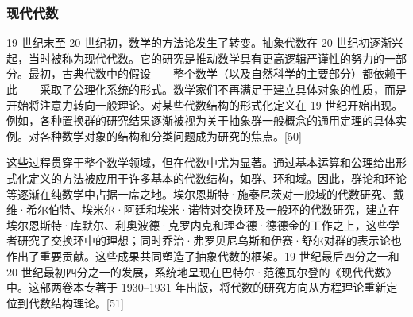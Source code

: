 \subsubsection{现代代数}
19 世纪末至 20 世纪初，数学的方法论发生了转变。抽象代数在 20 世纪初逐渐兴起，当时被称为现代代数。它的研究是推动数学具有更高逻辑严谨性的努力的一部分。最初，古典代数中的假设——整个数学（以及自然科学的主要部分）都依赖于此——采取了公理化系统的形式。数学家们不再满足于建立具体对象的性质，而是开始将注意力转向一般理论。对某些代数结构的形式化定义在 19 世纪开始出现。例如，各种置换群的研究结果逐渐被视为关于抽象群一般概念的通用定理的具体实例。对各种数学对象的结构和分类问题成为研究的焦点。[50]

这些过程贯穿于整个数学领域，但在代数中尤为显著。通过基本运算和公理给出形式化定义的方法被应用于许多基本的代数结构，如群、环和域。因此，群论和环论等逐渐在纯数学中占据一席之地。埃尔恩斯特·施泰尼茨对一般域的代数研究、戴维·希尔伯特、埃米尔·阿廷和埃米·诺特对交换环及一般环的代数研究，建立在埃尔恩斯特·库默尔、利奥波德·克罗内克和理查德·德德金的工作之上，这些学者研究了交换环中的理想；同时乔治·弗罗贝尼乌斯和伊赛·舒尔对群的表示论也作出了重要贡献。这些成果共同塑造了抽象代数的框架。19 世纪最后四分之一和 20 世纪最初四分之一的发展，系统地呈现在巴特尔·范德瓦尔登的《现代代数》中。这部两卷本专著于 1930–1931 年出版，将代数的研究方向从方程理论重新定位到代数结构理论。[51]
